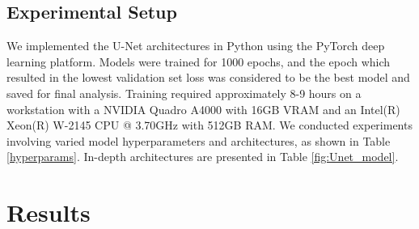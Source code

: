 \documentclass{article}
\begin{document}
\subsection{Experimental Setup}
We implemented the U-Net architectures in Python using the PyTorch deep learning platform. Models were trained for 1000 epochs, and the epoch which resulted in the lowest validation set loss was considered to be the best model and saved for final analysis. Training required approximately 8-9 hours on a workstation with a NVIDIA Quadro A4000 with 16GB VRAM and an Intel(R) Xeon(R) W-2145 CPU @ 3.70GHz with 512GB RAM. We conducted experiments involving varied model hyperparameters and architectures, as shown in Table \ref{hyperparams}. In-depth architectures are presented in Table \ref{fig:Unet_model}.

\begin{table}
  \caption{Experimental Hyperparameters}
  \label{hyperparams}
  \centering
\end{table}

\section{Results}
\label{sec:results}
\end{document}
